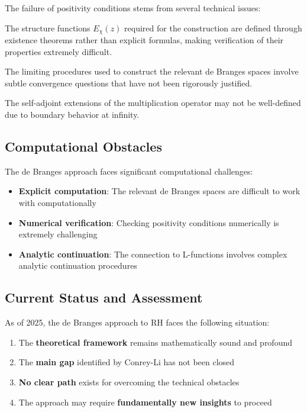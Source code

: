 The failure of positivity conditions stems from several technical issues:

\begin{problem}
The structure functions $E_\chi(z)$ required for the construction are defined through existence theorems rather than explicit formulas, making verification of their properties extremely difficult.
\end{problem}

\begin{problem}
The limiting procedures used to construct the relevant de Branges spaces involve subtle convergence questions that have not been rigorously justified.
\end{problem}

\begin{problem}
The self-adjoint extensions of the multiplication operator may not be well-defined due to boundary behavior at infinity.
\end{problem}

\subsection{Computational Obstacles}

The de Branges approach faces significant computational challenges:

\begin{itemize}
\item \textbf{Explicit computation}: The relevant de Branges spaces are difficult to work with computationally
\item \textbf{Numerical verification}: Checking positivity conditions numerically is extremely challenging  
\item \textbf{Analytic continuation}: The connection to L-functions involves complex analytic continuation procedures
\end{itemize}

\subsection{Current Status and Assessment}

\begin{assessment}
As of 2025, the de Branges approach to RH faces the following situation:
\begin{enumerate}
\item The \textbf{theoretical framework} remains mathematically sound and profound
\item The \textbf{main gap} identified by Conrey-Li has not been closed
\item \textbf{No clear path} exists for overcoming the technical obstacles
\item The approach may require \textbf{fundamentally new insights} to proceed
\end{enumerate}
\end{assessment}

